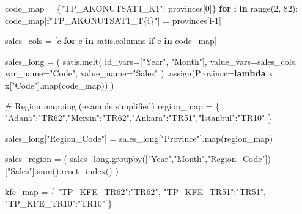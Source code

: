 \documentclass[
  11pt,
  a4paper,
  DIV=11,
  numbers=noendperiod]{scrartcl}
\newenvironment{Shaded}{\begin{snugshade}}{\end{snugshade}}
\newcommand{\BuiltInTok}[1]{\textcolor[rgb]{0.00,0.23,0.31}{#1}}
\newcommand{\CommentTok}[1]{\textcolor[rgb]{0.37,0.37,0.37}{#1}}
\newcommand{\ControlFlowTok}[1]{\textcolor[rgb]{0.00,0.23,0.31}{\textbf{#1}}}
\newcommand{\DecValTok}[1]{\textcolor[rgb]{0.68,0.00,0.00}{#1}}
\newcommand{\KeywordTok}[1]{\textcolor[rgb]{0.00,0.23,0.31}{\textbf{#1}}}
\newcommand{\NormalTok}[1]{\textcolor[rgb]{0.00,0.23,0.31}{#1}}
\newcommand{\OperatorTok}[1]{\textcolor[rgb]{0.37,0.37,0.37}{#1}}
\newcommand{\SpecialCharTok}[1]{\textcolor[rgb]{0.37,0.37,0.37}{#1}}
\newcommand{\SpecialStringTok}[1]{\textcolor[rgb]{0.13,0.47,0.30}{#1}}
\newcommand{\StringTok}[1]{\textcolor[rgb]{0.13,0.47,0.30}{#1}}
\begin{document}
\begin{Shaded}
\begin{Highlighting}[]
\NormalTok{code\_map }\OperatorTok{=}\NormalTok{ \{}\StringTok{"TP\_AKONUTSAT1\_K1"}\NormalTok{: provinces[}\DecValTok{0}\NormalTok{]\}}
\ControlFlowTok{for}\NormalTok{ i }\KeywordTok{in} \BuiltInTok{range}\NormalTok{(}\DecValTok{2}\NormalTok{, }\DecValTok{82}\NormalTok{):}
\NormalTok{    code\_map[}\SpecialStringTok{f"TP\_AKONUTSAT1\_T}\SpecialCharTok{\{}\NormalTok{i}\SpecialCharTok{\}}\SpecialStringTok{"}\NormalTok{] }\OperatorTok{=}\NormalTok{ provinces[i}\OperatorTok{{-}}\DecValTok{1}\NormalTok{]}

\NormalTok{sales\_cols }\OperatorTok{=}\NormalTok{ [c }\ControlFlowTok{for}\NormalTok{ c }\KeywordTok{in}\NormalTok{ satis.columns }\ControlFlowTok{if}\NormalTok{ c }\KeywordTok{in}\NormalTok{ code\_map]}

\NormalTok{sales\_long }\OperatorTok{=}\NormalTok{ (}
\NormalTok{    satis.melt(}
\NormalTok{        id\_vars}\OperatorTok{=}\NormalTok{[}\StringTok{"Year"}\NormalTok{, }\StringTok{"Month"}\NormalTok{],}
\NormalTok{        value\_vars}\OperatorTok{=}\NormalTok{sales\_cols,}
\NormalTok{        var\_name}\OperatorTok{=}\StringTok{"Code"}\NormalTok{,}
\NormalTok{        value\_name}\OperatorTok{=}\StringTok{"Sales"}
\NormalTok{    )}
\NormalTok{    .assign(Province}\OperatorTok{=}\KeywordTok{lambda}\NormalTok{ x: x[}\StringTok{"Code"}\NormalTok{].}\BuiltInTok{map}\NormalTok{(code\_map))}
\NormalTok{)}

\CommentTok{\# Region mapping (example simplified)}
\NormalTok{region\_map }\OperatorTok{=}\NormalTok{ \{}
    \StringTok{"Adana"}\NormalTok{:}\StringTok{"TR62"}\NormalTok{,}\StringTok{"Mersin"}\NormalTok{:}\StringTok{"TR62"}\NormalTok{,}\StringTok{"Ankara"}\NormalTok{:}\StringTok{"TR51"}\NormalTok{,}\StringTok{"İstanbul"}\NormalTok{:}\StringTok{"TR10"}
\NormalTok{\}}

\NormalTok{sales\_long[}\StringTok{"Region\_Code"}\NormalTok{] }\OperatorTok{=}\NormalTok{ sales\_long[}\StringTok{"Province"}\NormalTok{].}\BuiltInTok{map}\NormalTok{(region\_map)}

\NormalTok{sales\_region }\OperatorTok{=}\NormalTok{ (}
\NormalTok{    sales\_long.groupby([}\StringTok{"Year"}\NormalTok{,}\StringTok{"Month"}\NormalTok{,}\StringTok{"Region\_Code"}\NormalTok{])[}\StringTok{"Sales"}\NormalTok{].}\BuiltInTok{sum}\NormalTok{().reset\_index()}
\NormalTok{)}

\NormalTok{kfe\_map }\OperatorTok{=}\NormalTok{ \{}
    \StringTok{"TP\_KFE\_TR62"}\NormalTok{:}\StringTok{"TR62"}\NormalTok{,}
    \StringTok{"TP\_KFE\_TR51"}\NormalTok{:}\StringTok{"TR51"}\NormalTok{,}
    \StringTok{"TP\_KFE\_TR10"}\NormalTok{:}\StringTok{"TR10"}
\NormalTok{\}}


\end{Highlighting}
\end{Shaded}
\end{document}
